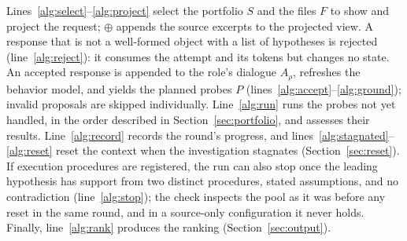 \documentclass[letterpaper,journal]{IEEEtran}
\begin{document}
Lines~\ref{alg:select}--\ref{alg:project} select the portfolio $S$ and the files $F$ to show and project the request; $\oplus$ appends the source excerpts to the projected view. A response that is not a well-formed object with a list of hypotheses is rejected (line~\ref{alg:reject}): it consumes the attempt and its tokens but changes no state. An accepted response is appended to the role's dialogue $A_\rho$, refreshes the behavior model, and yields the planned probes $P$ (lines~\ref{alg:accept}--\ref{alg:ground}); invalid proposals are skipped individually. Line~\ref{alg:run} runs the probes not yet handled, in the order described in Section~\ref{sec:portfolio}, and assesses their results. Line~\ref{alg:record} records the round's progress, and lines~\ref{alg:stagnated}--\ref{alg:reset} reset the context when the investigation stagnates (Section~\ref{sec:reset}). If execution procedures are registered, the run can also stop once the leading hypothesis has support from two distinct procedures, stated assumptions, and no contradiction (line~\ref{alg:stop}); the check inspects the pool as it was before any reset in the same round, and in a source-only configuration it never holds. Finally, line~\ref{alg:rank} produces the ranking (Section~\ref{sec:output}).
\end{document}

